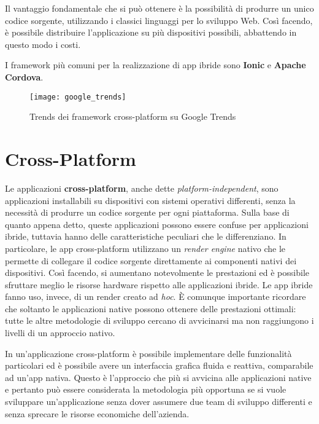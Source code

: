 Il vantaggio fondamentale che si può ottenere è la possibilità di produrre un unico codice sorgente, utilizzando i classici linguaggi per lo sviluppo Web. Così facendo, è possibile distribuire l'applicazione su più dispositivi possibili, abbattendo in questo modo i costi.

I framework più comuni per la realizzazione di app ibride sono \textbf{Ionic} e \textbf{Apache Cordova}.

\begin{figure}
	\begin{center}
		\texttt{[image: google\_trends]}
		\caption[Google Trends - Framework Cross-Paltform]{Trends dei framework cross-platform su Google Trends \cite{google_trends}}
		\label{figura:google_trends}
	\end{center}
\end{figure}

\section{Cross-Platform}
Le applicazioni \textbf{cross-platform}, anche dette \textit{platform-independent}, sono applicazioni installabili su dispositivi con sistemi operativi differenti, senza la necessità di produrre un codice sorgente per ogni piattaforma. Sulla base di quanto appena detto, queste applicazioni possono essere confuse per applicazioni ibride, tuttavia hanno delle caratteristiche peculiari che le differenziano. In particolare, le app cross-platform utilizzano un \textit{render engine} nativo che le permette di collegare il codice sorgente direttamente ai componenti nativi dei dispositivi. Così facendo, si aumentano notevolmente le prestazioni ed è possibile sfruttare meglio le risorse hardware rispetto alle applicazioni ibride. Le app ibride fanno uso, invece, di un render creato ad \textit{hoc}. È comunque importante ricordare che soltanto le applicazioni native possono ottenere delle prestazioni ottimali: tutte le altre metodologie di sviluppo cercano di avvicinarsi ma non raggiungono i livelli di un approccio nativo.

In un'applicazione cross-platform è possibile implementare delle funzionalità particolari ed è possibile avere un interfaccia grafica fluida e reattiva, comparabile ad un'app nativa. Questo è l'approccio che più si avvicina alle applicazioni native e pertanto può essere considerata la metodologia più opportuna se si vuole sviluppare un'applicazione senza dover assumere due team di sviluppo differenti e senza sprecare le risorse economiche dell'azienda.


